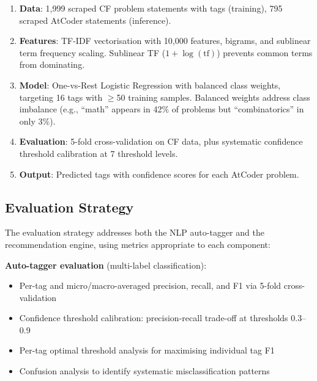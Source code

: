 \documentclass[12pt,a4paper]{article}
\begin{document}
\begin{enumerate}
    \item \textbf{Data}: 1,999 scraped CF problem statements with tags (training), 795 scraped AtCoder statements (inference).
    \item \textbf{Features}: TF-IDF vectorisation with 10,000 features, bigrams, and sublinear term frequency scaling. Sublinear TF ($1 + \log(\text{tf})$) prevents common terms from dominating.
    \item \textbf{Model}: One-vs-Rest Logistic Regression with balanced class weights, targeting 16 tags with $\geq$50 training samples. Balanced weights address class imbalance (e.g., ``math'' appears in 42\% of problems but ``combinatorics'' in only 3\%).
    \item \textbf{Evaluation}: 5-fold cross-validation on CF data, plus systematic confidence threshold calibration at 7 threshold levels.
    \item \textbf{Output}: Predicted tags with confidence scores for each AtCoder problem.
\end{enumerate}

\subsection{Evaluation Strategy}

The evaluation strategy addresses both the NLP auto-tagger and the recommendation engine, using metrics appropriate to each component:

\textbf{Auto-tagger evaluation} (multi-label classification):
\begin{itemize}
    \item Per-tag and micro/macro-averaged precision, recall, and F1 via 5-fold cross-validation
    \item Confidence threshold calibration: precision-recall trade-off at thresholds 0.3--0.9
    \item Per-tag optimal threshold analysis for maximising individual tag F1
    \item Confusion analysis to identify systematic misclassification patterns
\end{itemize}
\end{document}
